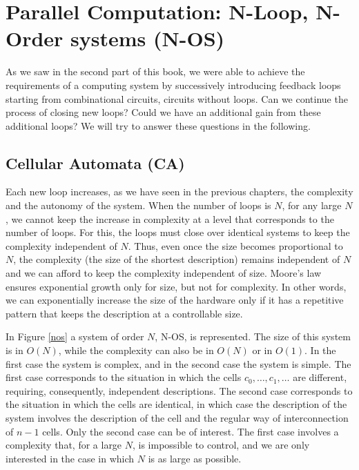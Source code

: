 \chapter{Parallel Computation: N-Loop, N-Order systems (N-OS)}\label{lect6b}




As we saw in the second part of this book, we were able to achieve the requirements of a computing system by successively introducing feedback loops starting from combinational circuits, circuits without loops. Can we continue the process of closing new loops? Could we have an additional gain from these additional loops? We will try to answer these questions in the following.

\section{Cellular Automata (CA)}

Each new loop increases, as we have seen in the previous chapters, the complexity and the autonomy of the system. When the number of loops is $N$, for any large $N$, we cannot keep the increase in complexity at a level that corresponds to the number of loops. For this, the loops must close over identical systems to keep the complexity independent of $N$. Thus, even once the size becomes proportional to $N$, the complexity (the size of the shortest description) remains independent of $N$ and we can afford to keep the complexity independent of size. Moore's law ensures exponential growth only for size, but not for complexity. In other words, we can exponentially increase the size of the hardware only if it has a repetitive pattern that keeps the description at a controllable size.


In Figure \ref{nos} a system of order $N$, N-OS, is represented. The size of this system is in $O(N)$, while the complexity can also be in $O(N)$ or in $O(1)$. In the first case the system is complex, and in the second case the system is simple. The first case corresponds to the situation in which the cells $c_0, \ldots, c_1, \ldots$ are different, requiring, consequently, independent descriptions. The second case corresponds to the situation in which the cells are identical, in which case the description of the system involves the description of the cell and the regular way of interconnection of $n-1$ cells. Only the second case can be of interest. The first case involves a complexity that, for a large $N$, is impossible to control, and we are only interested in the case in which $N$ is as large as possible. 

